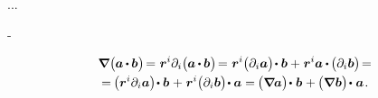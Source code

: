 ...

\dotproductinquotes\hbox{-}

\nopagebreak\vspace{-0.4em}\begin{multline}\label{gradientofdotproductoftwovectors}
\boldnabla \hspace{.1ex} \bigl( \hspace{-0.05ex} \bm{a} \hspace{-0.1ex} \dotp \hspace{-0.1ex} \bm{b} \hspace{.05ex} \bigr) \hspace{-0.3ex}
= \hspace{.1ex} \locationvector^i \partial_i \bigl( \hspace{-0.05ex} \bm{a} \hspace{-0.1ex} \dotp \hspace{-0.1ex} \bm{b} \hspace{.05ex} \bigr) \hspace{-0.33ex}
= \hspace{.1ex} \locationvector^i \bigl( \partial_i \bm{a} \bigr) \hspace{-0.32ex} \dotp \bm{b} + \hspace{.1ex} \locationvector^i \bm{a} \hspace{-0.05ex} \dotp \hspace{-0.15ex} \bigl( \partial_i \bm{b} \bigr) \hspace{-0.33ex} =
\\[-0.1em]
%
= \hspace{-0.2ex} \bigl( \locationvector^i \partial_i \bm{a} \bigr) \hspace{-0.32ex} \dotp \bm{b} \hspace{.1ex} + \hspace{.1ex} \locationvector^i \bigl( \partial_i \bm{b} \bigr) \hspace{-0.33ex} \dotp \bm{a}
= \hspace{-0.16ex} \bigl( \boldnabla \hspace{-0.1ex} \bm{a} \bigr) \hspace{-0.3ex} \dotp \hspace{.1ex} \bm{b} \hspace{.1ex} + \hspace{-0.1ex} \bigl( \boldnabla \hspace{.1ex} \bm{b} \bigr) \hspace{-0.27ex} \dotp \hspace{.1ex} \bm{a}
\hspace{.2ex} .
\end{multline}
